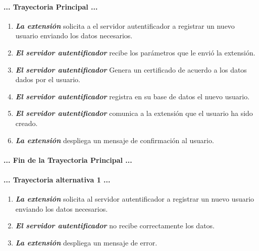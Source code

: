 \documentclass[12pt, a4paper, titlepage]{report}
\begin{document}
		\paragraph{... Trayectoria Principal ...}
			\begin{enumerate}
				
				\item \textbf{\textit{La extensión}} solicita a el servidor autentificador a registrar un nuevo usuario enviando los datos necesarios.
				
				\item \textbf{\textit{El servidor autentificador}} recibe los parámetros que le envió la extensión.
				
				\item \textbf{\textit{El servidor autentificador}} Genera un certificado de acuerdo a los datos dados por el usuario.
				
				\item \textbf{\textit{El servidor autentificador}} registra en su base de datos el nuevo usuario.
				
				\item \textbf{\textit{El servidor autentificador}} comunica a la extensión que el usuario ha sido creado.
				
				\item \textbf{\textit{La extensión}} despliega un mensaje de confirmación al usuario. 
			
			\end{enumerate}
		\paragraph{... Fin de la Trayectoria Principal ...}
		\paragraph{... Trayectoria alternativa 1 ...}
		\begin{enumerate}
		
		    \item \textbf{\textit{La extensión}} solicita al servidor autentificador a registrar un nuevo usuario enviando los datos necesarios.
		    
		    \item \textbf{\textit{El servidor autentificador}} no recibe correctamente los datos.
		    
		    \item \textbf{\textit{La extensión}} despliega un mensaje de error.
		\end{enumerate}
\end{document}
